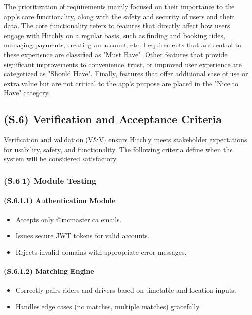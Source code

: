 \documentclass[12pt,letterpaper]{article}
\begin{document}
\par\raggedright
  The prioritization of requirements mainly focused on their importance to the app's core functionality, along with the safety and security of users and their data. 
  The core functionality refers to features that directly affect how users engage with Hitchly on a regular basis, such as finding and booking rides,
  managing payments, creating an account, etc. Requirements that are central to these experience are classified as "Must Have". Other features that provide
  significant improvements to convenience, trust, or improved user experience are categotized as "Should Have". Finally, features that offer additional ease of use
  or extra value but are not critical to the app's purpose are placed in the "Nice to Have" category.

\subsection{(S.6) Verification and Acceptance Criteria} %

Verification and validation (V\&V) ensure Hitchly meets stakeholder expectations for usability, safety, and functionality. The following criteria define when the system will be considered satisfactory.

\subsubsection{(S.6.1) Module Testing} %

\paragraph{(S.6.1.1) Authentication Module} %
\begin{itemize}
    \item Accepts only @mcmaster.ca emails.
    \item Issues secure JWT tokens for valid accounts.
    \item Rejects invalid domains with appropriate error messages.
\end{itemize}

\paragraph{(S.6.1.2) Matching Engine} %
\begin{itemize}
    \item Correctly pairs riders and drivers based on timetable and location inputs.
    \item Handles edge cases (no matches, multiple matches) gracefully.
\end{itemize}
\end{document}
